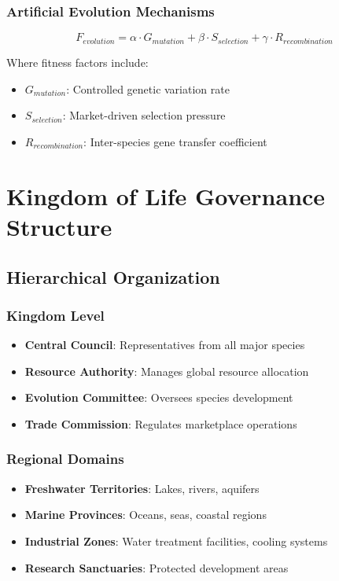\documentclass[11pt,a4paper]{article}
\begin{document}
\subsubsection{Artificial Evolution Mechanisms}
\begin{equation}
F_{evolution} = \alpha \cdot G_{mutation} + \beta \cdot S_{selection} + \gamma \cdot R_{recombination}
\end{equation}

Where fitness factors include:
\begin{itemize}
    \item $G_{mutation}$: Controlled genetic variation rate
    \item $S_{selection}$: Market-driven selection pressure
    \item $R_{recombination}$: Inter-species gene transfer coefficient
\end{itemize}

\section{Kingdom of Life Governance Structure}
\label{sec:governance}

\subsection{Hierarchical Organization}

\subsubsection{Kingdom Level}
\begin{itemize}
    \item \textbf{Central Council}: Representatives from all major species
    \item \textbf{Resource Authority}: Manages global resource allocation
    \item \textbf{Evolution Committee}: Oversees species development
    \item \textbf{Trade Commission}: Regulates marketplace operations
\end{itemize}

\subsubsection{Regional Domains}
\begin{itemize}
    \item \textbf{Freshwater Territories}: Lakes, rivers, aquifers
    \item \textbf{Marine Provinces}: Oceans, seas, coastal regions
    \item \textbf{Industrial Zones}: Water treatment facilities, cooling systems
    \item \textbf{Research Sanctuaries}: Protected development areas
\end{itemize}
\end{document}

